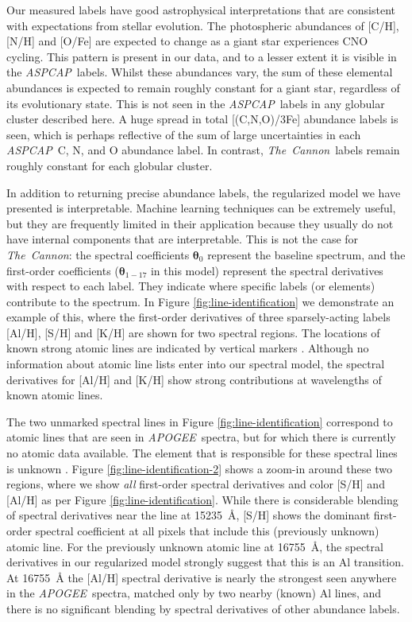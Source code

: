 \documentclass[12pt,preprint]{aastex}
\newcommand{\project}[1]{\textsl{#1}}
\newcommand{\TheCannon}{\project{The~Cannon}}
\newcommand{\acronym}[1]{{\small{#1}}}
\newcommand{\apogee}{\project{\acronym{APOGEE}}}
\newcommand{\aspcap}{\project{\acronym{ASPCAP}}}
\newcommand{\Dvector}[1]{\boldsymbol{#1}}
\newcommand{\vectheta}{\Dvector{\theta}}
\begin{document}
Our measured labels have good astrophysical
interpretations that are consistent with expectations from stellar
evolution.  The photospheric abundances of [C/H], [N/H] and [O/Fe] 
are expected to change as a giant star experiences CNO cycling.  This pattern is
present in our data, and to a lesser extent it is visible in the
\aspcap\ labels.  Whilst these abundances vary, the sum of these
elemental abundances is expected to remain roughly constant for a
giant star, regardless of its evolutionary state.  This is not 
seen in the \aspcap\ labels in any globular cluster described here.  
A huge spread in total [(C,N,O)/3Fe] abundance labels is seen, 
which is perhaps reflective of the sum of large uncertainties in
each \aspcap\ C, N, and O abundance label.  In contrast, \TheCannon\
labels remain roughly constant for each globular cluster.


In addition to returning precise abundance labels, the regularized model
we have presented is interpretable.  Machine learning techniques can be extremely
useful, but they are frequently limited in their application because they
usually do not have internal components that are interpretable.  This is
not the case for \TheCannon: the spectral coefficients $\vectheta_0$
represent the baseline spectrum, and the first-order coefficients 
($\vectheta_{1-17}$ in this model) represent the spectral derivatives with
respect to each label.  They indicate where specific labels (or elements)
contribute to the spectrum.  In Figure \ref{fig:line-identification} we
demonstrate an example of this, where the first-order derivatives of three
sparsely-acting labels [Al/H], [S/H] and [K/H] are shown for two spectral
regions.  The locations of known strong atomic lines are indicated by vertical
markers \citep{Smith_2013}. Although no information about atomic line lists
enter into our spectral model, the spectral derivatives for [Al/H] and [K/H] 
show strong contributions at wavelengths of known atomic lines.


The two unmarked spectral lines in Figure \ref{fig:line-identification} correspond
to atomic lines that are seen in \apogee\ spectra, but for which there is
currently no atomic data available.  The element that
is responsible for these spectral lines is unknown \citep{Shetrone_2015}.
Figure \ref{fig:line-identification-2} shows a zoom-in around these
two regions, where we show \emph{all} first-order spectral derivatives and
color [S/H] and [Al/H] as per Figure \ref{fig:line-identification}.  While
there is considerable blending of spectral derivatives near the line at 15235~\AA{}, [S/H] shows
the dominant first-order spectral coefficient at all pixels that include
this (previously unknown) atomic line.  For the previously unknown atomic line
at 16755~\AA{}, the spectral derivatives in our regularized model strongly
suggest that this is an Al transition. At 16755~\AA{} the [Al/H] spectral derivative
is nearly the strongest seen anywhere in the \apogee\ spectra, matched only
by two nearby (known) Al lines, and there is no significant blending by
spectral derivatives of other abundance labels. 
\end{document}
